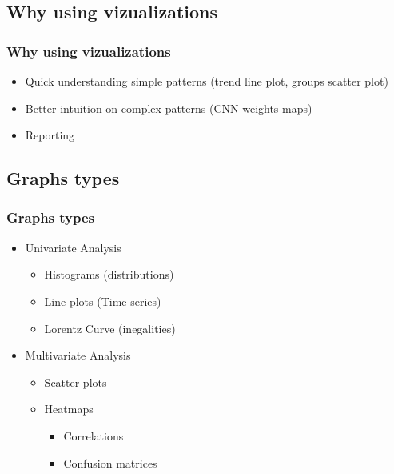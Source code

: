 \subsection{Why using vizualizations}

\begin{frame}\frametitle{Why using vizualizations}
   \begin{itemize}
      \item Quick understanding simple patterns (trend line plot, groups scatter plot)
      \item Better intuition on complex patterns (CNN weights maps)
      \item Reporting
   \end{itemize}
\end{frame}

\subsection{Graphs types}

\begin{frame}\frametitle{Graphs types}
   \begin{itemize}
      \item Univariate Analysis
      \begin{itemize}
         \item Histograms (distributions)
         \item Line plots (Time series)
         \item Lorentz Curve (inegalities)
      \end{itemize}
      \item Multivariate Analysis
      \begin{itemize}
         \item Scatter plots
         \item Heatmaps
         \begin{itemize}
            \item Correlations
            \item Confusion matrices
         \end{itemize}
      \end{itemize}
   \end{itemize}
\end{frame}


